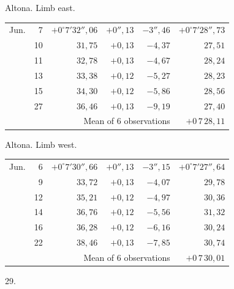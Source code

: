 \noindent\begin{minipage}[t]{.495\textwidth}\centering Altona. Limb east.\par\smallskip
{\scriptsize\setlength{\tabcolsep}{1pt}\renewcommand{\arraystretch}{1.2}\begin{tabular}{lr|r|r|r|r|}
Jun.&7&$+0^\circ7'32''{,}06$&$+0''{,}13$&$-3''{,}46$&$+0^\circ7'28''{,}73$\\
&10&$31{,}75$&$+0{,}13$&$-4{,}37$&$27{,}51$\\
&11&$32{,}78$&$+0{,}13$&$-4{,}67$&$28{,}24$\\
&13&$33{,}38$&$+0{,}12$&$-5{,}27$&$28{,}23$\\
&15&$34{,}30$&$+0{,}12$&$-5{,}86$&$28{,}56$\\
&27&$36{,}46$&$+0{,}13$&$-9{,}19$&$27{,}40$\\
\cline{6-6}\multicolumn{5}{r}{Mean of 6 observations}&$+0\,7\,28{,}11$
\end{tabular}}\end{minipage}\hfill\begin{minipage}[t]{.495\textwidth}\centering Altona. Limb west.\par\smallskip
{\scriptsize\setlength{\tabcolsep}{1pt}\renewcommand{\arraystretch}{1.2}\begin{tabular}{lr|r|r|r|r}
Jun.&6&$+0^\circ7'30''{,}66$&$+0''{,}13$&$-3''{,}15$&$+0^\circ7'27''{,}64$\\
&9&$33{,}72$&$+0{,}13$&$-4{,}07$&$29{,}78$\\
&12&$35{,}21$&$+0{,}12$&$-4{,}97$&$30{,}36$\\
&14&$36{,}76$&$+0{,}12$&$-5{,}56$&$31{,}32$\\
&16&$36{,}28$&$+0{,}12$&$-6{,}16$&$30{,}24$\\
&22&$38{,}46$&$+0{,}13$&$-7{,}85$&$30{,}74$\\
\cline{6-6}\multicolumn{5}{r}{Mean of 6 observations}&$+0\,7\,30{,}01$
\end{tabular}}\end{minipage}
\par\vspace{4mm}
\begin{center}29.\end{center}

